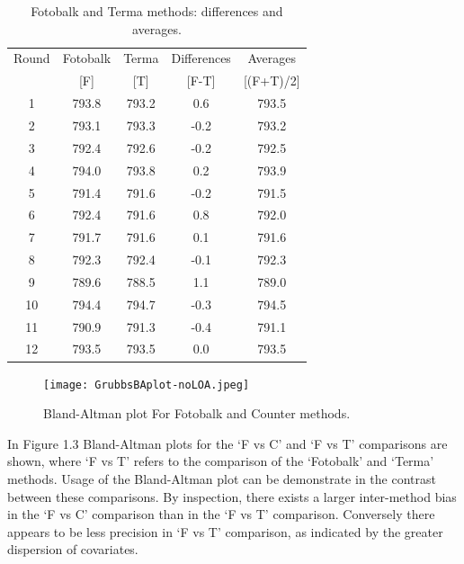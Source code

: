 \documentclass[12pt, a4paper]{report}
\begin{document}
	\begin{table}[h!]
		\renewcommand\arraystretch{0.7}%
		\begin{center}
			\begin{tabular}{|c||c|c||c|c|}
				\hline
				Round & Fotobalk  & Terma  & Differences  & Averages  \\
				&  [F] & [T] & [F-T] &  [(F+T)/2] \\
				\hline
				1 & 793.8 & 793.2 & 0.6 & 793.5 \\
				2 & 793.1 & 793.3 & -0.2 & 793.2 \\
				3 & 792.4 & 792.6 & -0.2 & 792.5 \\
				4 & 794.0 & 793.8 & 0.2 & 793.9 \\
				5 & 791.4 & 791.6 & -0.2 & 791.5 \\
				6 & 792.4& 791.6 & 0.8 & 792.0 \\
				7 & 791.7 & 791.6 & 0.1 & 791.6 \\
				8 & 792.3 & 792.4 & -0.1 & 792.3 \\
				9 & 789.6 & 788.5 & 1.1 & 789.0 \\
				10 & 794.4 & 794.7 & -0.3 & 794.5 \\
				11 & 790.9 & 791.3 & -0.4 & 791.1 \\
				12 & 793.5 & 793.5 & 0.0 & 793.5 \\
				
				\hline
			\end{tabular}
			\caption{Fotobalk and Terma methods: differences and averages.}
		\end{center}
	\end{table}
	
	\newpage
	
	\begin{figure}[h!]
		\begin{center}
			\texttt{[image: GrubbsBAplot-noLOA.jpeg]}
			\caption{Bland-Altman plot For Fotobalk and Counter methods.}\label{GrubbsBA-noLOA}
		\end{center}
	\end{figure}
	
	
	
	In Figure 1.3 Bland-Altman plots for the `F vs C' and `F vs T'
	comparisons are shown, where `F vs T' refers to the comparison of
	the `Fotobalk' and `Terma' methods. Usage of the Bland-Altman plot
	can be demonstrate in the contrast between these comparisons. By inspection, there exists a larger inter-method bias in the `F vs C' comparison than in the `F vs T' comparison. Conversely there
	appears to be less precision in `F vs T' comparison, as indicated
	by the greater dispersion of covariates.
	
\end{document}
